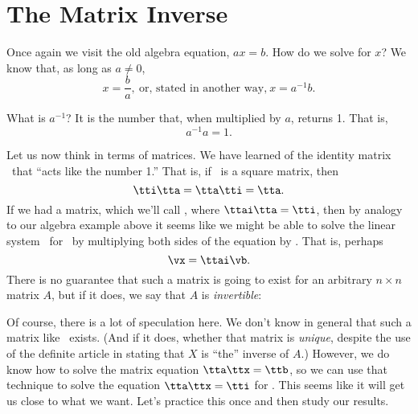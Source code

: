 \section{The Matrix Inverse}\label{sec:inverses}


Once again we visit the old algebra equation, $ax=b$. How do we solve for $x$? We know that, as long as $a\neq 0$, 
\[
x = \frac{b}{a}, \ \text{or, stated in another way,} \ x = a^{-1}b.
\]

What is $a^{-1}$? It is the number that, when multiplied by $a$, returns 1. That is, 
\[
a^{-1}a = 1.
\]

Let us now think in terms of matrices. We have learned of the identity matrix \tti\ that ``acts like the number 1.'' That is, if \tta\ is a square matrix, then 
\[
\tti\tta = \tta\tti = \tta.
\]
If we had a matrix, which we'll call \ttai, where $\ttai\tta=\tti$, then by analogy to our algebra example above it seems like we might be able to solve the linear system \ttaxb\ for \vx\ by multiplying both sides of the equation by \ttai. That is, perhaps 
\[
\vx = \ttai\vb.
\]
There is no guarantee that such a matrix is going to exist for an arbitrary $n\times n$ matrix $A$, but if it does, we say that $A$ is \textit{invertible}:

\smallskip


\smallskip

Of course, there is a lot of speculation here. We don't know in general that such a matrix like \ttai\ exists. (And if it does, whether that matrix is \textit{unique}, despite the use of the definite article in stating that $X$ is ``the'' inverse of $A$.) However, we do know how to solve the matrix equation $\tta\ttx = \ttb$, so we can use that technique to solve the equation $\tta\ttx = \tti$ for \ttx. This seems like it will get us close to what we want. Let's practice this once and then study our results.

